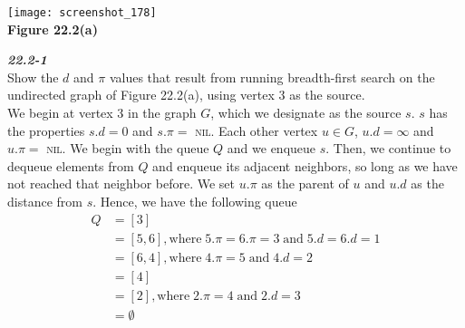 \documentclass{article}
\begin{document}
\begin{center}
\texttt{[image: screenshot\_178]}\\
\textbf{Figure 22.2(a)}
\end{center}

\textbf{\textit{22.2-1}}\\
Show the $d$ and $\pi$ values that result from running breadth-first search on the undirected graph of Figure 22.2(a), using vertex 3 as the source.\\

We begin at vertex 3 in the graph $G$, which we designate as the source $s$. $s$ has the properties $s.d = 0$ and $s.\pi =$ \textsc{nil}. Each other vertex $u \in G$, $u.d = \infty$ and $u.\pi =$ \textsc{nil}. We begin with the queue $Q$ and we enqueue $s.$ Then, we continue to dequeue elements from $Q$ and enqueue its adjacent neighbors, so long as we have not reached that neighbor before. We set $u.\pi$ as the parent of $u$ and $u.d$ as the distance from $s$.  Hence, we have the following queue
\begin{align*}
Q &= [3]\\
&= [5, 6], \text{where} \; 5.\pi = 6.\pi = 3 \; \text{and} \; 5.d = 6.d = 1\\
&= [6, 4], \text{where} \; 4.\pi = 5 \; \text{and} \; 4.d = 2\\
&= [4]\\
&= [2], \text{where} \; 2.\pi = 4 \; \text{and} \; 2.d = 3\\
&= \emptyset
\end{align*}
\end{document}
